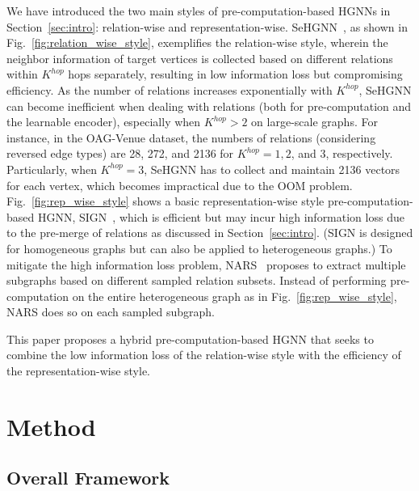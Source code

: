 \documentclass[lettersize,journal]{IEEEtran}
\begin{document}
We have introduced the two main styles of pre-computation-based HGNNs in Section~\ref{sec:intro}: relation-wise and representation-wise.
SeHGNN~\cite{yang2022simple}, as shown in Fig.~\ref{fig:relation_wise_style}, exemplifies the relation-wise style, wherein the neighbor information of target vertices is collected based on different relations within $K^{hop}$ hops separately, resulting in low information loss but compromising efficiency.
As the number of relations increases exponentially with $K^{hop}$, SeHGNN can become inefficient when dealing with relations (both for pre-computation and the learnable encoder), especially when $K^{hop} > 2$ on large-scale graphs.
For instance, in the OAG-Venue dataset, the numbers of relations (considering reversed edge types) are 28, 272, and 2136 for $K^{hop}=1, 2$, and 3, respectively.
Particularly, when $K^{hop}=3$, SeHGNN has to collect and maintain 2136 vectors for each vertex, which becomes impractical due to the OOM problem.
Fig.~\ref{fig:rep_wise_style} shows a basic representation-wise style pre-computation-based HGNN, SIGN~\cite{frasca2020sign}, which is efficient but may incur high information loss due to the pre-merge of relations as discussed in Section~\ref{sec:intro}.
(SIGN is designed for homogeneous graphs but can also be applied to heterogeneous graphs.)
To mitigate the high information loss problem, NARS~\cite{yu2020scalable} proposes to extract multiple subgraphs based on different sampled relation subsets. 
Instead of performing pre-computation on the entire heterogeneous graph as in Fig.~\ref{fig:rep_wise_style}, NARS does so on each sampled subgraph.



This paper proposes a hybrid pre-computation-based HGNN that seeks to combine the low information loss of the relation-wise style with the efficiency of the representation-wise style.











\section{Method}

\subsection{Overall Framework}
\end{document}
